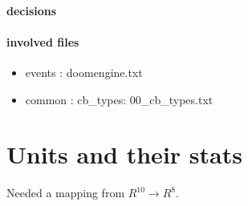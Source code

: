\documentclass[10pt, english]{article}
\begin{document}
\paragraph{decisions}

\paragraph{involved files}
\begin{itemize}
\item  events : doomengine.txt
\item common : cb\_types: 00\_cb\_types.txt
\end{itemize}

\section{Units and their stats}
Needed a mapping from $R^{10} \to R^8$.
\end{document}
